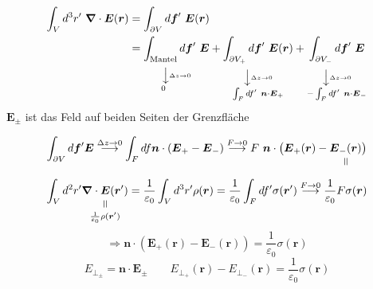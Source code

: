 \documentclass[titlepage,11pt,a4paper,ngerman]{report}
\newcommand{\verteq}{\rotatebox{90}{$\,=$}}
\newcommand{\equalto}[2]{\underset{\scriptstyle\overset{\mkern4mu\verteq}{#2}}{#1}}
\newcommand{\custo}[3]{\underset{\scriptstyle\overset{\mkern4mu\rotatebox{-90}{$\,#1$}}{#3}}{#2}}
\renewcommand{\vec}[1]{\boldsymbol{#1}}
\renewcommand{\epsilon}{\varepsilon}
\newcommand{\vabla}{\boldsymbol{\nabla}}
\begin{document}
\begin{align*}
\int_V d^3 r'\ \vabla \cdot \vec{E}(\vec{r}) &= \int_{\partial V} d\vec{f}'\ \vec{E}(\vec{r})\\
&=\custo{\overset{\rotatebox{90}{$\scriptscriptstyle{\Delta z \to 0}$}}{\longrightarrow}}{\int_{\textrm{Mantel}} d\vec{f}'\ \vec{E}}{\hspace{-23.5pt}0} + \custo{\overset{\rotatebox{90}{$\scriptscriptstyle{\Delta z \to 0}$}}{\longrightarrow}}{\int_{\partial V_+} d\vec{f}'\ \vec{E}(\vec{r})}{\int_F df'\ \vec{n} \cdot \vec{E}_+} + \custo{\overset{\rotatebox{90}{$\scriptscriptstyle{\Delta z \to 0}$}}{\longrightarrow}}{\int_{\partial V_-} d\vec{f}'\ \vec{E}}{- \int_F df'\ \vec{n} \cdot \vec{E}_-}
\end{align*}
$ \vec{E}_{\pm} $ ist das Feld auf beiden Seiten der Grenzfläche

\begin{equation*}
\int_{\partial V} d\vec{f}' \vec{E} \buildrel \Delta z \to 0 \over \longrightarrow \int_{F} df \vec{n} \cdot (\vec{E}_+ - \vec{E}_-) \buildrel F \to 0 \over \longrightarrow F\  \vec{n} \cdot \big(\vec{E}_+(\vec{r}) - \equalto{\vec{E}_-(\vec{r})}{}\big)
\end{equation*}
\begin{equation*}
\int_V d^2r' \equalto{\vec{\nabla} \cdot \vec{E}(\vec{r}')}{\frac{1}{\epsilon_0} \rho(\vec{r}')} = \frac{1}{\epsilon_0} \int_V d^3r' \rho(\vec{r}) = \frac{1}{\epsilon_0} \int_F df'  \sigma(\vec{r}') \buildrel F \to 0 \over \longrightarrow \frac{1}{\epsilon_0} F \sigma(\vec{r})
\end{equation*}
\begin{equation*}
\Rightarrow \vec{n} \cdot \left(\vec{E}_+(\vec{r}) - \vec{E}_-(\vec{r}) \right) = \frac{1}{\epsilon_0} \sigma(\vec{r})
\end{equation*}
\begin{equation*}
E_{\perp_\pm} = \vec{n} \cdot \vec{E}_{\pm} \qquad E_{\perp_+}(\vec{r}) - E_{\perp_-} (\vec{r}) = \frac{1}{\epsilon_0} \sigma(\vec{r})
\end{equation*}
\end{document}
